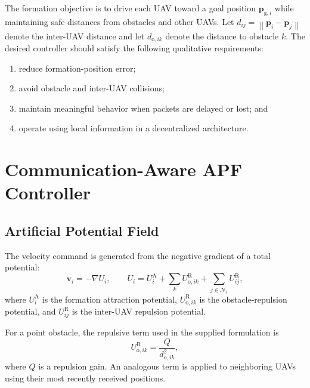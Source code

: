\documentclass[journal]{IEEEtran}
\newcommand{\bp}{\bm{p}}
\newcommand{\bv}{\bm{v}}
\newcommand{\norm}[1]{\left\lVert#1\right\rVert}
\begin{document}
The formation objective is to drive each UAV toward a goal position $\bp_{\mathrm{g},i}$ while maintaining safe distances from obstacles and other UAVs. Let $d_{ij}=\norm{\bp_i-\bp_j}$ denote the inter-UAV distance and let $d_{\mathrm{o},ik}$ denote the distance to obstacle $k$. The desired controller should satisfy the following qualitative requirements:
\begin{enumerate}
    \item reduce formation-position error;
    \item avoid obstacle and inter-UAV collisions;
    \item maintain meaningful behavior when packets are delayed or lost; and
    \item operate using local information in a decentralized architecture.
\end{enumerate}

\section{Communication-Aware APF Controller}
\label{sec:controller}
\subsection{Artificial Potential Field}
The velocity command is generated from the negative gradient of a total potential:
\begin{equation}
    \bv_i = -\nabla U_i,
    \qquad
    U_i = U_i^{\mathrm{A}} + \sum_{k} U_{\mathrm{o},ik}^{\mathrm{R}} + \sum_{j\in\mathcal{N}_i} U_{ij}^{\mathrm{R}},
    \label{eq:total_potential}
\end{equation}
where $U_i^{\mathrm{A}}$ is the formation attraction potential, $U_{\mathrm{o},ik}^{\mathrm{R}}$ is the obstacle-repulsion potential, and $U_{ij}^{\mathrm{R}}$ is the inter-UAV repulsion potential.

For a point obstacle, the repulsive term used in the supplied formulation is
\begin{equation}
    U_{\mathrm{o},ik}^{\mathrm{R}} = \frac{Q}{d_{\mathrm{o},ik}^{2}},
    \label{eq:obstacle_repulsion}
\end{equation}
where $Q$ is a repulsion gain. An analogous term is applied to neighboring UAVs using their most recently received positions.
\end{document}
